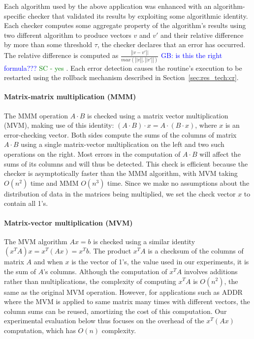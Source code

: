 \documentclass{sig-alternate}
\newcommand{\sui}[1]{%
  \textcolor{green}{SC - #1}
}
\newcommand{\greg}[1]{%
  \textcolor{blue}{GB: #1}
}
\begin{document}

Each algorithm used by the above application was enhanced with an algorithm-specific checker that validated its results by exploiting some algorithmic identity.
Each checker computes some aggregate property of the algorithm's results using two different algorithm to produce vectors $v$ and $v'$ and their relative difference by more than some threshold $\tau$, the checker declares that an error has occurred.
The relative difference is computed as $\frac{\left|| v-v' \right||}{max(\left||v\right||, \left||v'\right||)}$ \greg{is this the right formula???} \sui{yes}.
Each error detection causes the routine's execution to be restarted using the rollback mechanism described in Section~\ref{sec:res_tech:cr}.

\paragraph{Matrix-matrix multiplication (MMM)}
The MMM operation $A \cdot B$ is checked using a matrix vector multiplication (MVM), making use of this identity: $(A \cdot B) \cdot x = A \cdot (B \cdot x)$, where $x$ is an error-checking vector.
Both sides compute the sums of the columns of matrix $A \cdot B$ using a single matrix-vector multiplication on the left and two such operations on the right.
Most errors in the computation of $A \cdot B$ will affect the sums of its columns and will thus be detected.
This check is efficient because the checker is asymptotically faster than the MMM algorithm, with MVM taking $O(n^2)$ time and MMM $O(n^3)$ time.
Since we make no assumptions about the distribution of data in the matrices being multiplied, we set the check vector $x$ to contain all 1's.

\paragraph{Matrix-vector multiplication (MVM)}
The MVM algorithm $Ax=b$ is checked using a similar identity $(x^TA)x = x^T(Ax) = x^Tb$.
The product $x^TA$ is a checksum of the columns of matrix $A$ and when $x$ is the vector of 1's, the value used in our experiments, it is the sum of $A$'s columns.
Although the computation of $x^TA$ involves additions rather than multiplications, the complexity of computing $x^TA$ is $O(n^2)$, the same as the original MVM operation.
However, for applications such as ADDR where the MVM is applied to same matrix many times with different vectors, the column sums can be reused, amortizing the cost of this computation.
Our experimental evaluation below thus focuses on the overhead of the $x^T(Ax)$ computation, which has $O(n)$ complexity.
\end{document}

